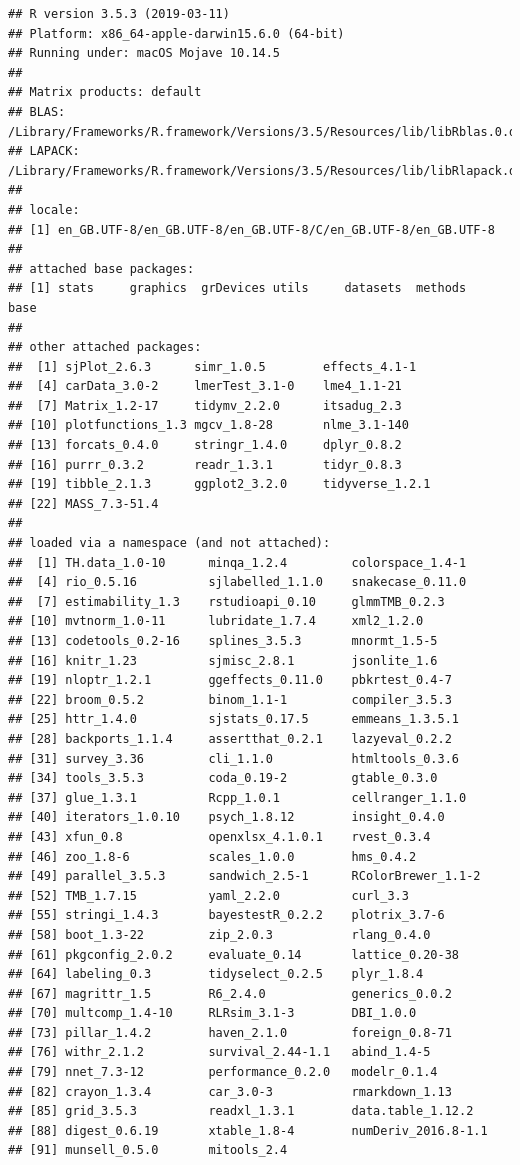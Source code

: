 \documentclass[]{article}
\begin{document}
\begin{verbatim}
## R version 3.5.3 (2019-03-11)
## Platform: x86_64-apple-darwin15.6.0 (64-bit)
## Running under: macOS Mojave 10.14.5
## 
## Matrix products: default
## BLAS: /Library/Frameworks/R.framework/Versions/3.5/Resources/lib/libRblas.0.dylib
## LAPACK: /Library/Frameworks/R.framework/Versions/3.5/Resources/lib/libRlapack.dylib
## 
## locale:
## [1] en_GB.UTF-8/en_GB.UTF-8/en_GB.UTF-8/C/en_GB.UTF-8/en_GB.UTF-8
## 
## attached base packages:
## [1] stats     graphics  grDevices utils     datasets  methods   base     
## 
## other attached packages:
##  [1] sjPlot_2.6.3      simr_1.0.5        effects_4.1-1    
##  [4] carData_3.0-2     lmerTest_3.1-0    lme4_1.1-21      
##  [7] Matrix_1.2-17     tidymv_2.2.0      itsadug_2.3      
## [10] plotfunctions_1.3 mgcv_1.8-28       nlme_3.1-140     
## [13] forcats_0.4.0     stringr_1.4.0     dplyr_0.8.2      
## [16] purrr_0.3.2       readr_1.3.1       tidyr_0.8.3      
## [19] tibble_2.1.3      ggplot2_3.2.0     tidyverse_1.2.1  
## [22] MASS_7.3-51.4    
## 
## loaded via a namespace (and not attached):
##  [1] TH.data_1.0-10      minqa_1.2.4         colorspace_1.4-1   
##  [4] rio_0.5.16          sjlabelled_1.1.0    snakecase_0.11.0   
##  [7] estimability_1.3    rstudioapi_0.10     glmmTMB_0.2.3      
## [10] mvtnorm_1.0-11      lubridate_1.7.4     xml2_1.2.0         
## [13] codetools_0.2-16    splines_3.5.3       mnormt_1.5-5       
## [16] knitr_1.23          sjmisc_2.8.1        jsonlite_1.6       
## [19] nloptr_1.2.1        ggeffects_0.11.0    pbkrtest_0.4-7     
## [22] broom_0.5.2         binom_1.1-1         compiler_3.5.3     
## [25] httr_1.4.0          sjstats_0.17.5      emmeans_1.3.5.1    
## [28] backports_1.1.4     assertthat_0.2.1    lazyeval_0.2.2     
## [31] survey_3.36         cli_1.1.0           htmltools_0.3.6    
## [34] tools_3.5.3         coda_0.19-2         gtable_0.3.0       
## [37] glue_1.3.1          Rcpp_1.0.1          cellranger_1.1.0   
## [40] iterators_1.0.10    psych_1.8.12        insight_0.4.0      
## [43] xfun_0.8            openxlsx_4.1.0.1    rvest_0.3.4        
## [46] zoo_1.8-6           scales_1.0.0        hms_0.4.2          
## [49] parallel_3.5.3      sandwich_2.5-1      RColorBrewer_1.1-2 
## [52] TMB_1.7.15          yaml_2.2.0          curl_3.3           
## [55] stringi_1.4.3       bayestestR_0.2.2    plotrix_3.7-6      
## [58] boot_1.3-22         zip_2.0.3           rlang_0.4.0        
## [61] pkgconfig_2.0.2     evaluate_0.14       lattice_0.20-38    
## [64] labeling_0.3        tidyselect_0.2.5    plyr_1.8.4         
## [67] magrittr_1.5        R6_2.4.0            generics_0.0.2     
## [70] multcomp_1.4-10     RLRsim_3.1-3        DBI_1.0.0          
## [73] pillar_1.4.2        haven_2.1.0         foreign_0.8-71     
## [76] withr_2.1.2         survival_2.44-1.1   abind_1.4-5        
## [79] nnet_7.3-12         performance_0.2.0   modelr_0.1.4       
## [82] crayon_1.3.4        car_3.0-3           rmarkdown_1.13     
## [85] grid_3.5.3          readxl_1.3.1        data.table_1.12.2  
## [88] digest_0.6.19       xtable_1.8-4        numDeriv_2016.8-1.1
## [91] munsell_0.5.0       mitools_2.4
\end{verbatim}
\end{document}
